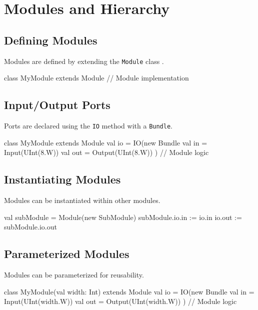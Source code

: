 \section{Modules and Hierarchy}
\subsection{Defining Modules}
Modules are defined by extending the \texttt{Module} class \cite{chisel-doc}.

\begin{chiselcode}
class MyModule extends Module {
  // Module implementation
}    
\end{chiselcode}

\subsection{Input/Output Ports}
Ports are declared using the \texttt{IO} method with a \texttt{Bundle}.
\begin{chiselcode}
class MyModule extends Module {
  val io = IO(new Bundle {
    val in  = Input(UInt(8.W))
    val out = Output(UInt(8.W))
  })
  // Module logic
}    
\end{chiselcode}

\subsection{Instantiating Modules}
Modules can be instantiated within other modules.
\begin{chiselcode}
val subModule = Module(new SubModule)
subModule.io.in := io.in
io.out := subModule.io.out
\end{chiselcode}

\subsection{Parameterized Modules}
Modules can be parameterized for reusability.
\begin{chiselcode}
class MyModule(val width: Int) extends Module {
  val io = IO(new Bundle {
    val in  = Input(UInt(width.W))
    val out = Output(UInt(width.W))
  })
  // Module logic
}    
\end{chiselcode}

